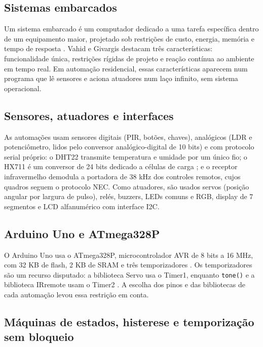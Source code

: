 \documentclass[12pt]{article}
\begin{document}
\subsection{Sistemas embarcados}

Um sistema embarcado é um computador dedicado a uma tarefa específica dentro de um equipamento maior, projetado sob restrições de custo, energia, memória e tempo de resposta \cite{marwedel2021}. Vahid e Givargis \cite{vahid2002} destacam três características: funcionalidade única, restrições rígidas de projeto e reação contínua ao ambiente em tempo real. Em automação residencial, essas características aparecem num programa que lê sensores e aciona atuadores num laço infinito, sem sistema operacional.

\subsection{Sensores, atuadores e interfaces}

As automações usam sensores digitais (PIR, botões, chaves), analógicos (LDR e potenciômetro, lidos pelo conversor analógico-digital de 10 bits) e com protocolo serial próprio: o DHT22 transmite temperatura e umidade por um único fio; o HX711 é um conversor de 24 bits dedicado a células de carga \cite{avia2014}; e o receptor infravermelho demodula a portadora de 38 kHz dos controles remotos, cujos quadros seguem o protocolo NEC. Como atuadores, são usados servos (posição angular por largura de pulso), relés, buzzers, LEDs comuns e RGB, display de 7 segmentos e LCD alfanumérico com interface I2C.

\subsection{Arduino Uno e ATmega328P}

O Arduino Uno usa o ATmega328P, microcontrolador AVR de 8 bits a 16 MHz, com 32 KB de flash, 2 KB de SRAM e três temporizadores \cite{microchip2018}. Os temporizadores são um recurso disputado: a biblioteca Servo usa o Timer1, enquanto \texttt{tone()} e a biblioteca IRremote usam o Timer2 \cite{monk2016}. A escolha dos pinos e das bibliotecas de cada automação levou essa restrição em conta.

\subsection{Máquinas de estados, histerese e temporização sem bloqueio}
\end{document}
